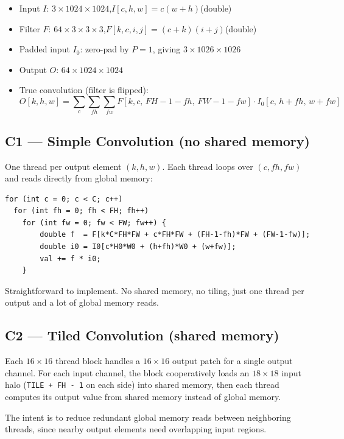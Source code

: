 \documentclass[11pt,letterpaper]{article}
\begin{document}
\begin{itemize}
  \item Input $I$: $3 \times 1024 \times 1024$,\quad $I[c,h,w] = c(w+h)$\quad (double)
  \item Filter $F$: $64 \times 3 \times 3 \times 3$,\quad $F[k,c,i,j]=(c+k)(i+j)$\quad (double)
  \item Padded input $I_0$: zero-pad by $P=1$, giving $3 \times 1026 \times 1026$
  \item Output $O$: $64 \times 1024 \times 1024$
  \item True convolution (filter is flipped):
        \[
          O[k,h,w] = \sum_{c}\sum_{fh}\sum_{fw}
          F[k,c,\,FH-1-fh,\,FW-1-fw]\cdot I_0[c,\,h+fh,\,w+fw]
        \]
\end{itemize}

\subsection{C1 --- Simple Convolution (no shared memory)}

One thread per output element $(k,h,w)$. Each thread loops over $(c, fh, fw)$
and reads directly from global memory:

\begin{lstlisting}[caption={C1 kernel inner loop}]
for (int c = 0; c < C; c++)
  for (int fh = 0; fh < FH; fh++)
    for (int fw = 0; fw < FW; fw++) {
        double f  = F[k*C*FH*FW + c*FH*FW + (FH-1-fh)*FW + (FW-1-fw)];
        double i0 = I0[c*H0*W0 + (h+fh)*W0 + (w+fw)];
        val += f * i0;
    }
\end{lstlisting}

Straightforward to implement. No shared memory, no tiling, just one thread per
output and a lot of global memory reads.

\subsection{C2 --- Tiled Convolution (shared memory)}

Each $16\times16$ thread block handles a $16\times16$ output patch for a single
output channel. For each input channel, the block cooperatively loads an $18\times18$
input halo (\texttt{TILE + FH - 1} on each side) into shared memory, then each
thread computes its output value from shared memory instead of global memory.

The intent is to reduce redundant global memory reads between neighboring threads,
since nearby output elements need overlapping input regions.
\end{document}
